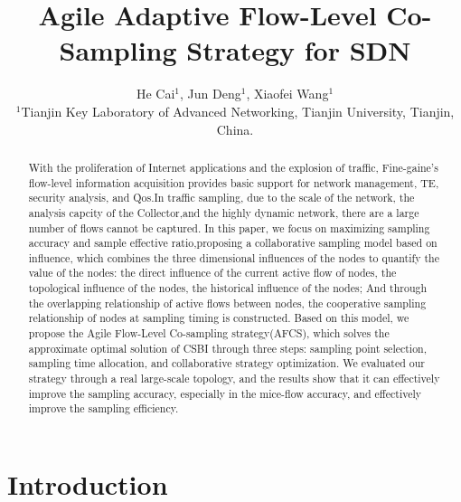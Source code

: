 \documentclass[conference]{IEEEtran}
\begin{document}
\title{ Agile Adaptive Flow-Level Co-Sampling Strategy for SDN}

\author{He Cai$^{1}$, Jun Deng$^{1}$, Xiaofei Wang$^{1}$
\\
${^1}$Tianjin Key Laboratory of Advanced Networking, %
Tianjin University, Tianjin, China.
}


\maketitle

\begin{abstract}
With the proliferation of Internet applications and the explosion of traffic, Fine-gaine's flow-level information acquisition provides basic support for network management, TE, security analysis, and Qos.In traffic sampling, due to the scale of the network, the analysis capcity of the Collector,and the highly dynamic network, there are a large number of flows cannot be captured. In this paper, we focus on maximizing sampling accuracy and sample effective ratio,proposing a collaborative sampling model based on influence, which combines the three dimensional influences of the nodes to quantify the value of the nodes: the direct influence of the current active flow of nodes, the topological influence of the nodes, the historical influence of the nodes; And through the overlapping relationship of active flows between nodes, the cooperative sampling relationship of nodes at sampling timing is constructed. Based on this model, we propose the Agile Flow-Level Co-sampling strategy(AFCS), which solves the approximate optimal solution of CSBI through three steps: sampling point selection, sampling time allocation, and collaborative strategy optimization. We evaluated our strategy through a real large-scale topology, and the results show that it can effectively improve the sampling accuracy, especially in the mice-flow accuracy, and effectively improve the sampling efficiency.
\end{abstract}
\IEEEpeerreviewmaketitle

\section{Introduction}
\end{document}

